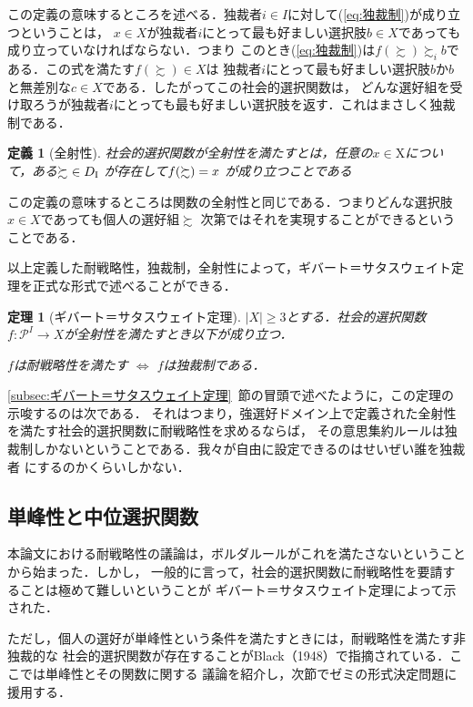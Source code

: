 \documentclass[dvipdfmx]{jsarticle}
\newtheorem*{THeorem}{定理}
\newtheorem*{DEfinition}{定義}
\begin{document}
この定義の意味するところを述べる．独裁者$i \in I$に対して(\ref{eq:独裁制})が成り立つということは，
$x \in X$が独裁者$i$にとって最も好ましい選択肢$b \in X$であっても成り立っていなければならない．つまり
このとき(\ref{eq:独裁制})は$f(\succsim) \succsim_i b$である．この式を満たす$f(\succsim) \in X$は
独裁者$i$にとって最も好ましい選択肢$b$か$b$と無差別な$c \in X$である．したがってこの社会的選択関数は，
どんな選好組を受け取ろうが独裁者$i$にとっても最も好ましい選択肢を返す．これはまさしく独裁制である．


\begin{DEfinition}[全射性]
  社会的選択関数が全射性を満たすとは，任意の$x \in \mathrm{X}$について，ある$\succsim \ \in \mathnormal{D}_{\mathrm{I}}$
  が存在して$\mathnormal{f}(\succsim) = x$
  が成り立つことである
\end{DEfinition}

この定義の意味するところは関数の全射性と同じである．つまりどんな選択肢$x \in X$であっても個人の選好組$\succsim$
次第ではそれを実現することができるということである．

以上定義した耐戦略性，独裁制，全射性によって，ギバート＝サタスウェイト定理を正式な形式で述べることができる．

\begin{THeorem}[ギバート＝サタスウェイト定理]
  $|X| \geq 3$とする．社会的選択関数
  $f\colon \mathcal{P}^{I} \to X$が全射性を満たすとき以下が成り立つ．
  \begin{center}
    $f$は耐戦略性を満たす $\Leftrightarrow$ $f$は独裁制である．
  \end{center}
\end{THeorem}

\ref{subsec:ギバート＝サタスウェイト定理}~節の冒頭で述べたように，この定理の示唆するのは次である．
それはつまり，強選好ドメイン上で定義された全射性を満たす社会的選択関数に耐戦略性を求めるならば，
その意思集約ルールは独裁制しかないということである．我々が自由に設定できるのはせいぜい誰を独裁者
にするのかくらいしかない．


\subsection{単峰性と中位選択関数}\label{subsec:単峰性と中位選択関数}
本論文における耐戦略性の議論は，ボルダルールがこれを満たさないということから始まった．しかし，
一般的に言って，社会的選択関数に耐戦略性を要請することは極めて難しいということが
ギバート＝サタスウェイト定理によって示された．

ただし，個人の選好が単峰性という条件を満たすときには，耐戦略性を満たす非独裁的な
社会的選択関数が存在することがBlack（1948）で指摘されている．ここでは単峰性とその関数に関する
議論を紹介し，次節でゼミの形式決定問題に援用する．
\end{document}
